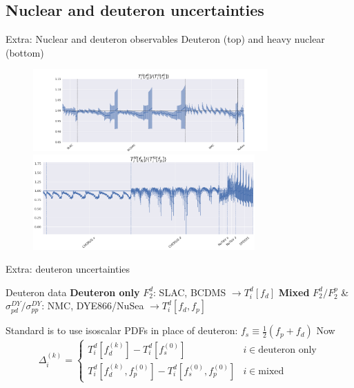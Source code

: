 \author[Rosalyn Pearson]{}
\subsection{Nuclear and deuteron uncertainties}
\begin{frame}{Extra: Nuclear and deuteron observables}
\footnotesize{Deuteron (top) and heavy nuclear (bottom) }
  \begin{figure}
    \includegraphics[width=90mm, trim={30mm, 0, 30mm, 0}]{nuclear_uncs/obsdeut.png}
    \includegraphics[width=85mm]{nuclear_uncs/obsnuc.png}
  \end{figure}
\end{frame}

\begin{frame}{Extra: deuteron uncertainties}

\begin{block}{Deuteron data}
{\bf Deuteron only} $F_2^d$: SLAC, BCDMS  $\to T_i^d[f_d]$
\newline
{\bf Mixed} $F_2^d/F_2^p$ \& $\sigma_{pd}^{DY}/\sigma_{pp}^{DY}$: NMC, DYE866/NuSea  $ \to T_i^d[f_d, f_p]$
\end{block}
Standard is to use isoscalar PDFs in place of deuteron: $f_s \equiv \frac{1}{2}(f_p + f_d)$
Now 
\begin{equation}
\Delta_i^{(k)} = \begin{cases}
T_i^d[f_d^{(k)}] - T_i^d[f_s^{(0)}] & i \in \text{deuteron only}\\
T_i^d[f_d^{(k)}, f_p^{(0)}] - T_i^d[f_s^{(0)}, f_p^{(0)}] & i \in \text{mixed}
\end{cases}
\end{equation}
\end{frame}

